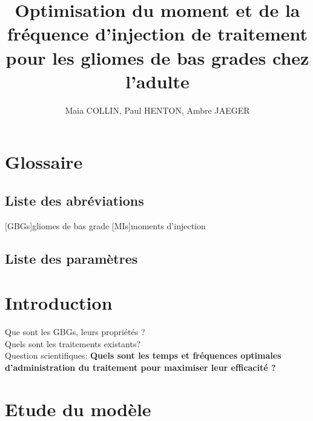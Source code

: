 \documentclass[12pt,a4paper]{article}
\title{Optimisation du moment et de la fréquence d'injection de traitement pour les gliomes de bas grades chez l'adulte}
\author{Maia COLLIN, Paul HENTON, Ambre JAEGER} %
\begin{document}
\maketitle

\section{Glossaire}
\subsection{Liste des abréviations}
\begin{acronym}
[GBGs]{gliomes de bas grade}%
[MIs]{moments d'injection}
\end{acronym}
\subsection{Liste des paramètres}


\section{Introduction}
Que sont les \acp{GBG}, leurs propriétés ?\\
Quels sont les traitements existants?\\
Question scientifiques: \textbf{Quels sont les temps et fréquences optimales d'administration du traitement pour maximiser leur efficacité ?}


\section{Etude du modèle}
\end{document}

